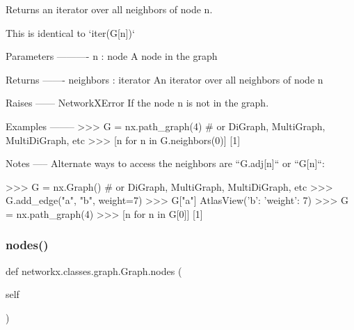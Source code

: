 \begin{DoxyVerb}Returns an iterator over all neighbors of node n.

This is identical to `iter(G[n])`

Parameters
----------
n : node
   A node in the graph

Returns
-------
neighbors : iterator
    An iterator over all neighbors of node n

Raises
------
NetworkXError
    If the node n is not in the graph.

Examples
--------
>>> G = nx.path_graph(4)  # or DiGraph, MultiGraph, MultiDiGraph, etc
>>> [n for n in G.neighbors(0)]
[1]

Notes
-----
Alternate ways to access the neighbors are ``G.adj[n]`` or ``G[n]``:

>>> G = nx.Graph()  # or DiGraph, MultiGraph, MultiDiGraph, etc
>>> G.add_edge("a", "b", weight=7)
>>> G["a"]
AtlasView({'b': {'weight': 7}})
>>> G = nx.path_graph(4)
>>> [n for n in G[0]]
[1]
\end{DoxyVerb}
 \mbox{\label{classnetworkx_1_1classes_1_1graph_1_1Graph_ab5b03b460e5b1f2a06feaddcfb4fda3a}} 
\subsubsection{\texorpdfstring{nodes()}{nodes()}}
{\footnotesize\ttfamily def networkx.\+classes.\+graph.\+Graph.\+nodes (\begin{DoxyParamCaption}\item[{}]{self }\end{DoxyParamCaption})}

